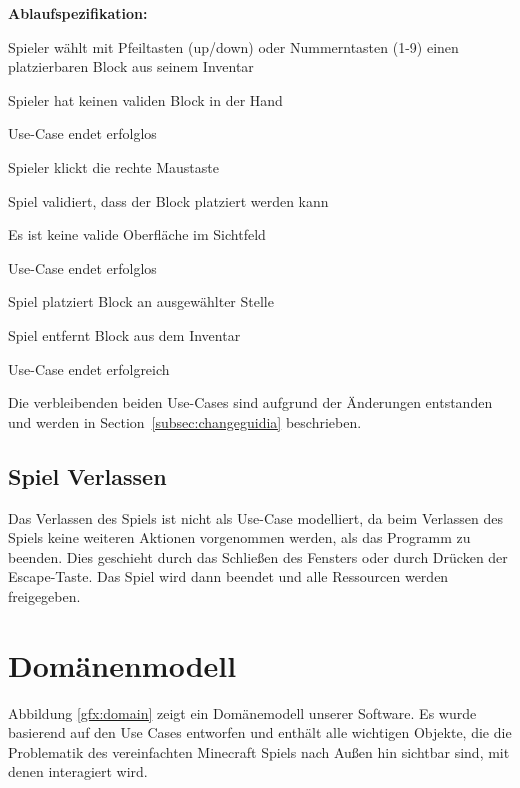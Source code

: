 \documentclass{article}
\begin{document}
\textbf{Ablaufspezifikation:}
\begin{description}[style=nextline,leftmargin=1.9cm,labelwidth=1.6cm]
  \item[1.] Spieler wählt mit Pfeiltasten (up/down) oder Nummerntasten (1-9) einen platzierbaren Block aus seinem Inventar
  \item[1a.] Spieler hat keinen validen Block in der Hand
  \item[1a.1.] Use-Case endet erfolglos
  \item[2.] Spieler klickt die rechte Maustaste
  \item[3.] Spiel validiert, dass der Block platziert werden kann
  \item[3a.] Es ist keine valide Oberfläche im Sichtfeld
  \item[3a.1.] Use-Case endet erfolglos
  \item[4.] Spiel platziert Block an ausgewählter Stelle
  \item[5.] Spiel entfernt Block aus dem Inventar
  \item[6.] Use-Case endet erfolgreich
\end{description}

Die verbleibenden beiden Use-Cases sind aufgrund der Änderungen entstanden und werden in Section~\ref{subsec:changeguidia} beschrieben.

\subsection*{Spiel Verlassen}

Das Verlassen des Spiels ist nicht als Use-Case modelliert, da beim Verlassen des Spiels keine weiteren Aktionen vorgenommen werden, als das Programm zu beenden. Dies geschieht durch das Schlie\ss{}en des Fensters oder durch Drücken der Escape-Taste. Das Spiel wird dann beendet und alle Ressourcen werden freigegeben.

\newpage
\section{Domänenmodell} \label{subsec:domain}

Abbildung \ref{gfx:domain} zeigt ein Domänemodell unserer Software. Es wurde basierend auf den Use Cases entworfen und enthält alle wichtigen Objekte, die die Problematik des vereinfachten Minecraft Spiels nach Au\ss{}en hin sichtbar sind, mit denen interagiert wird. 
\end{document}
